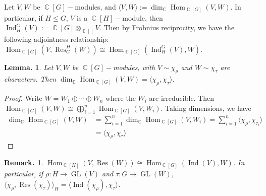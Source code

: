 \documentclass[11pt, a4paper]{memoir}
\DeclareMathOperator{\C}{{\mathbb{C}}}
\theoremstyle{change}
\newtheorem{lemma}[theorem]{Lemma.}
\theoremstyle{plain}
\theoremstyle{nonumberplain}
\newtheorem{remark}{Remark.}
\newtheorem{proof}{Proof}
\DeclareMathOperator{\GL}{GL}
\DeclareMathOperator{\Hom}{Hom}
\DeclareMathOperator{\Res}{Res}
\DeclareMathOperator{\Ind}{Ind}
\numberwithin{equation}{section}
\begin{document}
Let $V,W$ be $\C[G]-$modules, and $\langle V,W\rangle:=\dim_{\C}\Hom_{\C[G]}(V,W)$.
In particular, if $H\leq G$, $V$ is a $\C[H]-$module, then $\Ind_H^G(V):=\C[G]\otimes_{\C[]}V$.
Then by Frobnius reciprocity, we have the following adjointness relationship: $\Hom_{\C[G]}(V,\Res_G^H(W))\cong\Hom_{\C[G]}(\Ind_H^G(V),W)$.
\begin{lemma}
    Let $V,W$ be $\C[G]-$modules, with $V\sim\chi_\rho$ and $W\sim\chi_\tau$ are characters.
    Then $\dim_{\C}\Hom_{\C[G]}(V,W)=\langle\chi_\rho,\chi_\tau\rangle$.
\end{lemma}
\begin{proof}
    Write $W=W_1\oplus\cdots\oplus W_n$ where the $W_i$ are irreducible.
    Then $\Hom_{\C[G]}(V,W)\cong\bigoplus_{i=1}^n\Hom_{\C[G]}(V,W_i)$.
    Taking dimensions, we have
    \begin{align*}
        \dim_{\C}\Hom_{\C[G]}(V,W) &=\sum_{i=1}^n\dim_{\C}\Hom_{\C[G]}(V,W_i)=\sum_{i=1}^n\langle\chi_\rho,\chi_{\tau_i}\rangle\\
                                   &= \langle\chi_\rho,\chi_\tau\rangle
    \end{align*}
\end{proof}
\begin{remark}
    $\Hom_{\C[H]}(V,\Res(W))\cong \Hom_{\C[G]}(\Ind(V),W)$.
    In particular, if $\rho:H\to\GL(V)$ and $\tau:G\to\GL(W)$, $\langle\chi_\rho,\Res(\chi_\tau)\rangle_H=\langle\Ind(\chi_\rho),\chi_\tau\rangle$.
\end{remark}
\end{document}
